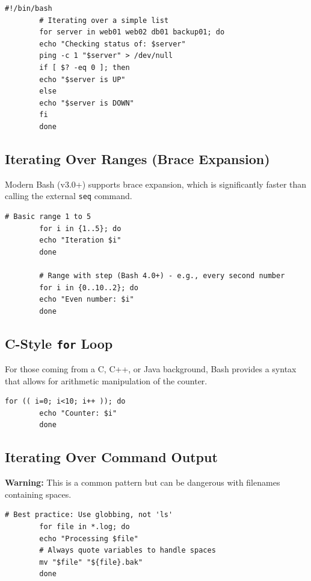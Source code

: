 \documentclass[12pt,a4paper]{article}
\begin{document}
	\begin{lstlisting}[caption=Basic for loop example]
		#!/bin/bash
		# Iterating over a simple list
		for server in web01 web02 db01 backup01; do
		echo "Checking status of: $server"
		ping -c 1 "$server" > /dev/null
		if [ $? -eq 0 ]; then
		echo "$server is UP"
		else
		echo "$server is DOWN"
		fi
		done
	\end{lstlisting}
	
	\subsection{Iterating Over Ranges (Brace Expansion)}
	Modern Bash (v3.0+) supports brace expansion, which is significantly faster than calling the external \texttt{seq} command.
	
	\begin{lstlisting}[caption=Range-based iteration]
		# Basic range 1 to 5
		for i in {1..5}; do
		echo "Iteration $i"
		done
		
		# Range with step (Bash 4.0+) - e.g., every second number
		for i in {0..10..2}; do
		echo "Even number: $i"
		done
	\end{lstlisting}
	
	\subsection{C-Style \texttt{for} Loop}
	For those coming from a C, C++, or Java background, Bash provides a syntax that allows for arithmetic manipulation of the counter.
	
	\begin{lstlisting}[caption=C-style for loop]
		for (( i=0; i<10; i++ )); do
		echo "Counter: $i"
		done
	\end{lstlisting}
	
	\subsection{Iterating Over Command Output}
	\textbf{Warning:} This is a common pattern but can be dangerous with filenames containing spaces. 
	
	\begin{lstlisting}[caption=Iterating over files (The Globbing Way)]
		# Best practice: Use globbing, not 'ls'
		for file in *.log; do
		echo "Processing $file"
		# Always quote variables to handle spaces
		mv "$file" "${file}.bak"
		done
	\end{lstlisting}
	
	\newpage
\end{document}

